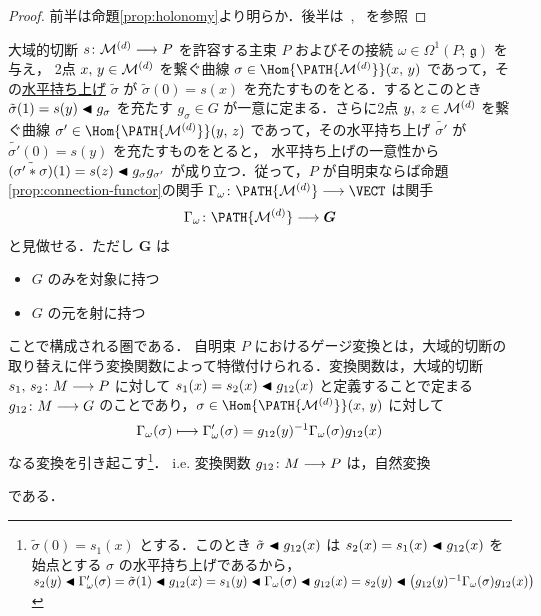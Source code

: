 \documentclass[TQFT_main]{subfiles}
\begin{document}
\begin{proof}
    前半は命題\ref{prop:holonomy}より明らか．後半は~\cite{Baez2004holonomy}, ~\cite{barrett1991holonomy}を参照
\end{proof}

大域的切断 $s \colon \mathcal{M}^{(d)} \longrightarrow P$ を許容する主束 $P$ およびその接続 $\omega \in \Omega^1(P;\, \mathfrak{g})$ を与え，
2点 $x,\, y \in \mathcal{M}^{(d)}$ を繋ぐ曲線 $\sigma \in \Hom{\PATH{\mfdcal{M}{d}}}(x,\, y)$ であって，その\hyperref[def:horizontal-lift-curve]{水平持ち上げ} $\tilde{\sigma}$ が $\tilde{\sigma} (0) = s(x)$ を充たすものをとる．するとこのとき
$\tilde{\sigma}(1) = s(y) \blacktriangleleft g_\sigma$ を充たす $g_\sigma \in G$ が一意に定まる．さらに2点 $y,\, z \in \mathcal{M}^{(d)}$ を繋ぐ曲線 $\sigma' \in \Hom{\PATH{\mfdcal{M}{d}}}(y,\, z)$ であって，その水平持ち上げ $\tilde{\sigma'}$ が $\tilde{\sigma'}(0) = s(y)$ を充たすものをとると，
水平持ち上げの一意性から $\tilde{(\sigma' * \sigma)} (1) = s(z) \blacktriangleleft g_\sigma g_{\sigma'}$ が成り立つ．従って，$P$ が自明束ならば命題\ref{prop:connection-functor}の関手 $\Gamma_\omega \colon \PATH{\mfdcal{M}{d}} \lto \VECT$ は関手
\begin{align}
    \Gamma_\omega \colon \PATH{\mfdcal{M}{d}} \lto \bm{G}
\end{align}
と見做せる．ただし $\bm{G}$ は
\begin{itemize}
    \item $G$ のみを対象に持つ
    \item $G$ の元を射に持つ
\end{itemize}
ことで構成される圏である．
自明束 $P$ におけるゲージ変換とは，大域的切断の取り替えに伴う変換関数によって特徴付けられる．変換関数は，大域的切断 $s_1,\, s_2 \colon M \longrightarrow P$ に対して $s_1(x) = s_2(x) \blacktriangleleft g_{12}(x)$ と定義することで定まる $g_{12} \colon M \longrightarrow G$ のことであり，$\sigma \in \Hom{\PATH{\mfdcal{M}{d}}}(x,\, y)$ に対して
\begin{align}
    \label{eq:gauge-transform-trivial}
    \Gamma_\omega (\sigma) \longmapsto \Gamma'_\omega (\sigma) = g_{12}(y)^{-1} \Gamma_\omega(\sigma) g_{12}(x)
\end{align}
なる変換を引き起こす\footnote{$\tilde{\sigma}(0) = s_1(x)$ とする．このとき $\tilde{\sigma} \blacktriangleleft g_{12}(x)$ は $s_2(x) = s_1(x) \blacktriangleleft g_{12} (x)$ を始点とする $\sigma$ の水平持ち上げであるから，$s_2(y) \blacktriangleleft \Gamma'_\omega(\sigma) = \tilde{\sigma}(1) \blacktriangleleft g_{12}(x) = s_1(y) \blacktriangleleft \Gamma_\omega(\sigma) \blacktriangleleft g_{12}(x) = s_2(y) \blacktriangleleft \bigl( g_{12}(y)^{-1} \Gamma_\omega(\sigma)g_{12}(x) \bigr)$}．
i.e. 変換関数 $g_{12} \colon M \longrightarrow P$ は，自然変換
\begin{center}
\end{center}
である．
\end{document}
